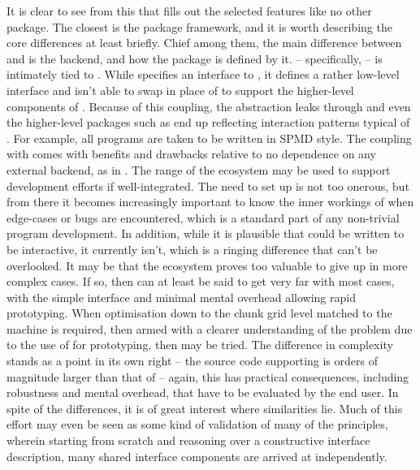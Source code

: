 It is clear to see from this that \lsr{} fills out the selected features like no other package.
The closest is the  package framework, and it is worth describing the core differences at least briefly.
Chief among them, the main difference between  and \lsr{} is the backend, and how the package is defined by it.
 -- specifically,  -- is intimately tied to . 
While  specifies an interface to , it defines a rather low-level interface and isn't able to swap in place of  to support the higher-level components of .
Because of this coupling, the abstraction leaks through and even the higher-level packages such as  end up reflecting interaction patterns typical of .
For example, all programs are taken to be written in SPMD style.
The coupling with  comes with benefits and drawbacks relative to no dependence on any external backend, as in \lsr{}.
The range of the  ecosystem may be used to support development efforts if well-integrated.
The need to set up  is not too onerous, but from there it becomes increasingly important to know the inner workings of  when edge-cases or bugs are encountered, which is a standard part of any non-trivial program development.
In addition, while it is plausible that  could be written to be interactive, it currently isn't, which is a ringing difference that can't be overlooked.
It may be that the  ecosystem proves too valuable to give up in more complex cases.
If so, then \lsr{} can at least be said to get very far with most cases, with the simple interface and minimal mental overhead allowing rapid prototyping.
When optimisation down to the chunk grid level matched to the machine is required, then armed with a clearer understanding of the problem due to the use of \lsr{} for prototyping, then  may be tried.
The difference in complexity stands as a point in its own right -- the source code supporting  is orders of magnitude larger than that of \lsr{} -- again, this has practical consequences, including robustness and mental overhead, that have to be evaluated by the end user.
In spite of the differences, it is of great interest where similarities lie.
Much of this effort may even be seen as some kind of validation of many of the  principles, wherein starting from scratch and reasoning over a constructive interface description, many shared interface components are arrived at independently.

